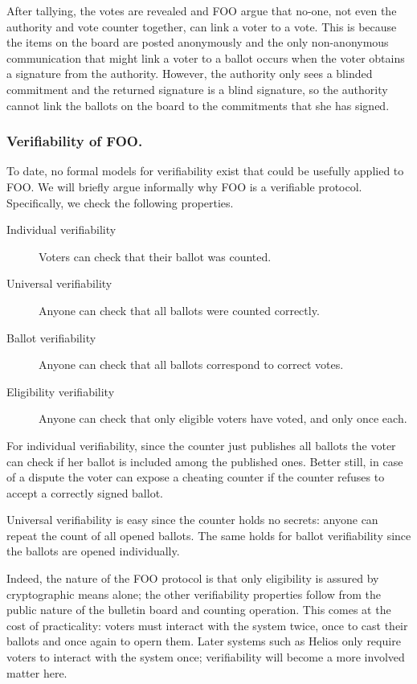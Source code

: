 \documentclass[envcountsame]{llncs}
\begin{document}
After tallying, the votes are revealed and FOO argue that no-one, not even the
authority and vote counter together, can link a voter to a vote. This is
because the items on the board are posted anonymously and the only
non-anonymous communication that might link a voter to a ballot occurs when the
voter obtains a signature from the authority. However, the authority only sees
a blinded commitment and the returned signature is a blind signature, so the
authority cannot link the ballots on the board to the commitments that she has
signed.

\subsubsection{Verifiability of FOO.}

To date, no formal models for verifiability exist that could be usefully
applied to FOO.  We will briefly argue informally why FOO is a verifiable
protocol. Specifically, we check the following properties.

\begin{description}
\item[Individual verifiability] Voters can check that their ballot was counted.
\item[Universal verifiability] Anyone can check that all ballots were counted
 correctly.
\item[Ballot verifiability] Anyone can check that all ballots correspond to
 correct votes.
\item[Eligibility verifiability] Anyone can check that only eligible voters have
voted, and only once each.
\end{description}

For individual verifiability, since the counter just publishes all ballots the
voter can check if her ballot is included among the published ones. Better
still, in case of a dispute the voter can expose a cheating counter if the
counter refuses to accept a correctly signed ballot.

Universal verifiability is easy since the counter holds no secrets: anyone can
repeat the count of all opened ballots. The same holds for ballot verifiability
since the ballots are opened individually.

Indeed, the nature of the FOO protocol is that only eligibility is assured by
cryptographic means alone; the other verifiability properties follow from the
public nature of the bulletin board and counting operation. This comes at the
cost of practicality: voters must interact with the system twice, once to cast
their ballots and once again to opern them. Later systems such as Helios only
require voters to interact with the system once; verifiability will become a
more involved matter here.
\end{document}
